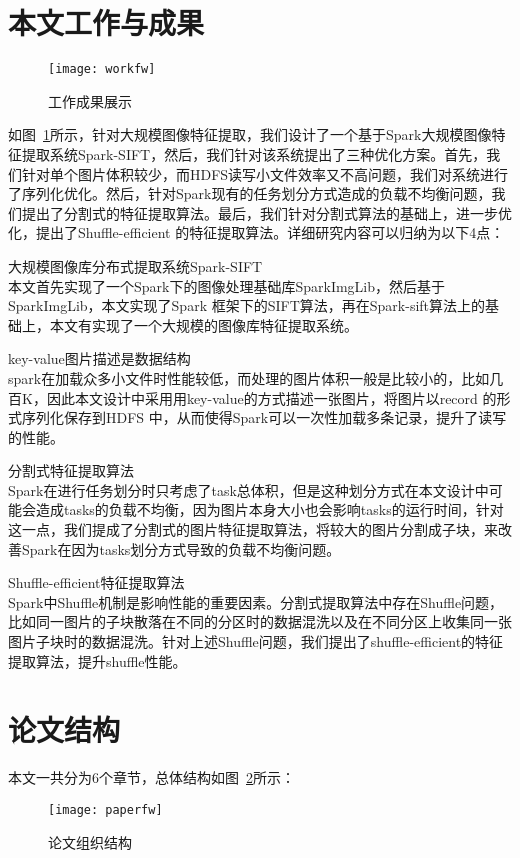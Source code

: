 \section{本文工作与成果}
\begin{figure}[htp]
\centering
\texttt{[image: workfw]}
\caption{工作成果展示}
\label{fig:workfw}
\end{figure}
如图~\ref{fig:workfw}所示，针对大规模图像特征提取，我们设计了一个基于Spark大规模图像特征提取系统Spark-SIFT，然后，我们针对该系统提出了三种优化方案。首先，我们针对单个图片体积较少，而HDFS读写小文件效率又不高问题，我们对系统进行了序列化优化。然后，针对Spark现有的任务划分方式造成的负载不均衡问题，我们提出了分割式的特征提取算法。最后，我们针对分割式算法的基础上，进一步优化，提出了Shuffle-efficient 的特征提取算法。详细研究内容可以归纳为以下4点：
\begin{compactenum}
\item 大规模图像库分布式提取系统Spark-SIFT\\本文首先实现了一个Spark下的图像处理基础库SparkImgLib，然后基于SparkImgLib，本文实现了Spark 框架下的SIFT算法，再在Spark-sift算法上的基础上，本文有实现了一个大规模的图像库特征提取系统。
\item key-value图片描述是数据结构\\spark在加载众多小文件时性能较低，而处理的图片体积一般是比较小的，比如几百K，因此本文设计中采用用key-value的方式描述一张图片，将图片以record 的形式序列化保存到HDFS 中，从而使得Spark可以一次性加载多条记录，提升了读写的性能。
\item 分割式特征提取算法\\Spark在进行任务划分时只考虑了task总体积，但是这种划分方式在本文设计中可能会造成tasks的负载不均衡，因为图片本身大小也会影响tasks的运行时间，针对这一点，我们提成了分割式的图片特征提取算法，将较大的图片分割成子块，来改善Spark在因为tasks划分方式导致的负载不均衡问题。
\item Shuffle-efficient特征提取算法\\Spark中Shuffle机制是影响性能的重要因素。分割式提取算法中存在Shuffle问题，比如同一图片的子块散落在不同的分区时的数据混洗以及在不同分区上收集同一张图片子块时的数据混洗。针对上述Shuffle问题，我们提出了shuffle-efficient的特征提取算法，提升shuffle性能。
\end{compactenum}

\section{论文结构}
本文一共分为6个章节，总体结构如图~\ref{fig:paperfw}所示：
\begin{figure}[htp]
\centering
\texttt{[image: paperfw]}
\caption{论文组织结构}
\label{fig:paperfw}
\end{figure}

